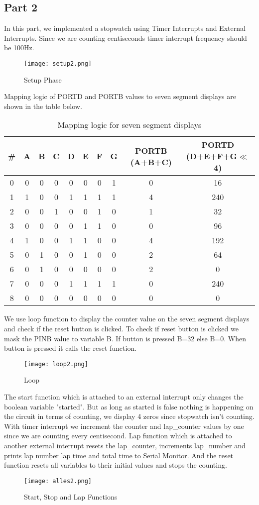 \documentclass[pdftex,12pt,a4paper]{article}
\begin{document}
\subsection{Part 2}
In this part, we implemented a stopwatch using Timer Interrupts and External Interrupts. Since we are counting centiseconds timer interrupt frequency should be 100Hz. 
\begin{figure}[H]
	\centering
	\texttt{[image: setup2.png]}
	\label{fig7}
	\caption{Setup Phase}
\end{figure}
Mapping logic of PORTD and PORTB values to seven segment displays are shown in the table below.
\begin{table}[H]
\centering
\small
\begin{tabular}{|c|c|c|c|c|c|c|c|c|c|}
\hline
# & A & B & C & D & E & F & G & PORTB (A+B+C) & PORTD (D+E+F+G$\ll$4)\\
\hline
0 & 0 & 0 & 0 & 0 & 0 & 0 & 1 & 0 & 16\\
\hline
1 & 1 & 0 & 0 & 1 & 1 & 1 & 1 & 4 & 240\\
\hline
2 & 0 & 0 & 1 & 0 & 0 & 1 & 0 & 1 & 32\\
\hline
3 & 0 & 0 & 0 & 0 & 1 & 1 & 0 & 0 & 96\\
\hline
4 & 1 & 0 & 0 & 1 & 1 & 0 & 0 & 4 & 192\\
\hline
5 & 0 & 1 & 0 & 0 & 1 & 0 & 0 & 2 & 64\\
\hline
6 & 0 & 1 & 0 & 0 & 0 & 0 & 0 & 2 & 0\\
\hline
7 & 0 & 0 & 0 & 1 & 1 & 1 & 1 & 0 & 240\\
\hline
8 & 0 & 0 & 0 & 0 & 0 & 0 & 0 & 0 & 0\\
\hline
\end{tabular}
\caption{Mapping logic for seven segment displays}
\end{table}
We use loop function to display the counter value on the seven segment displays and check if the reset button is clicked. To check if reset button is clicked we mask the PINB value to variable B. If button is pressed B=32 else B=0. When button is pressed it calls the reset function.
\begin{figure}[H]
	\centering
	\texttt{[image: loop2.png]}
	\label{fig7}
	\caption{Loop}
\end{figure}
The start function which is attached to an external interrupt only changes the boolean variable "started". But as long as started is false nothing is happening on the circuit in terms of counting, we display 4 zeros since stopwatch isn't counting.
With timer interrupt we increment the counter and lap\_counter values by one since we are counting every centisecond.
Lap function which is attached to another external interrupt resets the lap\_counter, increments lap\_number and prints lap number lap time and total time to Serial Monitor.
And the reset function resets all variables to their initial values and stops the counting.
\begin{figure}[H]
	\centering
	\texttt{[image: alles2.png]}
	\caption{Start, Stop and Lap Functions}
\end{figure}
\end{document}
